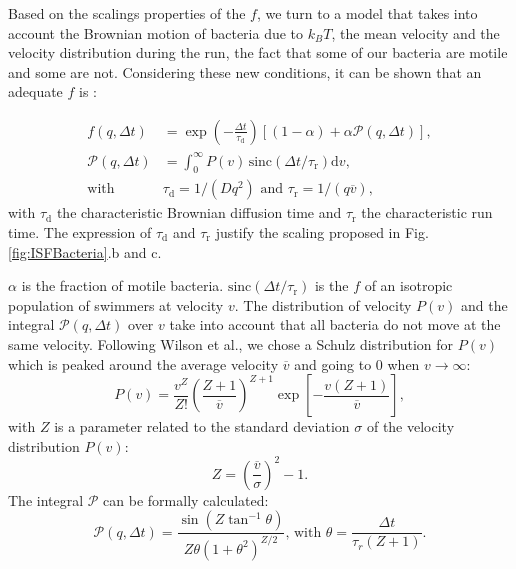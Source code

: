 \documentclass[prb,twocolumn,amsmath,amssymb]{revtex4-1}
\begin{document}
Based on the scalings properties of the $f$, we turn to a model that takes into account the Brownian motion of bacteria due to $k_BT$, the mean velocity and the velocity distribution during the run, the fact that some of our bacteria are motile and some are not. Considering these new conditions, it can be shown that an adequate $f$ is \citep{1_BactMobil}:

\begin{align}
f(q, \Delta t) &= \exp\left(-\frac{\Delta t}{\tau_\text{d}}\right)\left[(1-\alpha) + \alpha \mathcal{P}(q, \Delta t)\right],\label{eq:fbact}\\
\mathcal{P}(q, \Delta t) &= \int_{0}^{\infty} P(v)\, \text{sinc}(\Delta t/\tau_\text{r}) \mathrm{d}v,\\
\text{with } &\tau_\text{d} = 1/(Dq^2) \text{ and } \tau_\text{r}=1/(q\overline{v}),\label{eq:taus}
\end{align}
with $\tau_\text{d}$ the characteristic Brownian diffusion time and $\tau_\text{r}$ the characteristic run time. The expression of $\tau_\text{d}$ and $\tau_\text{r}$ justify the scaling proposed in Fig. \ref{fig:ISFBacteria}.b and c.

$\alpha$ is the fraction of motile bacteria. $\text{sinc}(\Delta t/\tau_\text{r})$ is the $f$ of an isotropic population of swimmers at velocity $v$. The distribution of velocity $P(v)$ and the integral $\mathcal{P}(q, \Delta t)$ over $v$ take into account that all bacteria do not move at the same velocity. Following Wilson et al.\cite{1_BactMobil}, we chose a Schulz distribution for $P(v)$ which is peaked around the average velocity $\overline{v}$ and going to 0 when $v \rightarrow \infty$:
\begin{equation}
P(v) = \frac{v^Z}{Z!} \left(\frac{Z+1}{\overline{v}}\right)^{Z+1} \exp\left[-\frac{v(Z+1)}{\overline{v}}\right],
\end{equation}
with $Z$ is a parameter related to the standard deviation $\sigma$ of the velocity distribution $P(v)$:
\begin{equation}
Z = \left( \frac{\overline{v}}{\sigma} \right)^2 -1.
\label{eq:sig}
\end{equation}
The integral $\mathcal{P}$ can be formally calculated:
\begin{equation}
\mathcal{P}(q, \Delta t) = \frac{\sin\left(Z\tan^{-1}\theta\right)}{Z\theta\left(1+\theta^2\right)^{Z/2}}\text{, with }\theta = \frac{\Delta t}{\tau_r(Z+1)}. 
\end{equation}
\end{document}
